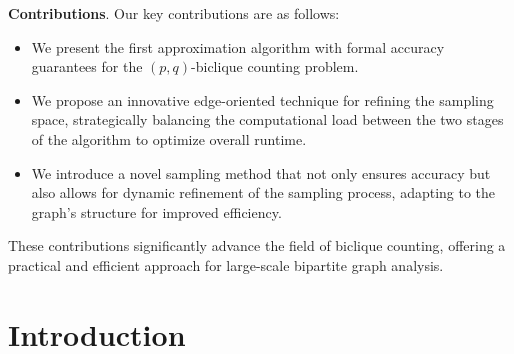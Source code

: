 \documentclass[sigconf, nonacm]{acmart}
\begin{document}
\textbf{Contributions}. Our key contributions are as follows:

\begin{itemize}
	\item We present the first approximation algorithm with formal accuracy guarantees for the $(p,q)$-biclique counting problem.
	\item We propose an innovative edge-oriented technique for refining the sampling space, strategically balancing the computational load between the two stages of the algorithm to optimize overall runtime.
	\item We introduce a novel sampling method that not only ensures accuracy but also allows for dynamic refinement of the sampling process, adapting to the graph’s structure for improved efficiency.
\end{itemize}

These contributions significantly advance the field of biclique counting, offering a practical and efficient approach for large-scale bipartite graph analysis.



\section{Introduction}

%
\end{document}
